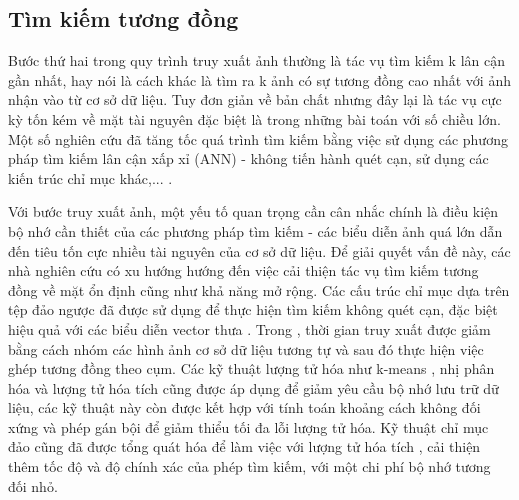 \subsection{Tìm kiếm tương đồng}
Bước thứ hai trong quy trình truy xuất ảnh thường là tác vụ tìm kiếm k lân cận gần nhất, hay nói là cách khác là tìm ra k ảnh có sự tương đồng cao nhất với ảnh nhận vào từ cơ sở dữ liệu. Tuy đơn giản về bản chất nhưng đây lại là tác vụ cực kỳ tốn kém về mặt tài nguyên đặc biệt là trong những bài toán với số chiều lớn. Một số nghiên cứu đã tăng tốc quá trình tìm kiếm bằng việc sử dụng các phương pháp tìm kiếm lân cận xấp xỉ (ANN) - không tiến hành quét cạn, sử dụng các kiến trúc chỉ mục khác,... \cite{4270175, Xie2015ImageCA, Mikolajczyk2007ImprovingDF, Muja2009FastAN, Muja2012FastMO, wang2017survey, magliani2019efficient, johnson2017billionscale}.

Với bước truy xuất ảnh, một yếu tố quan trọng cần cân nhắc chính là điều kiện bộ nhớ cần thiết của các phương pháp tìm kiếm - các biểu diễn ảnh quá lớn dẫn đến tiêu tốn cực nhiều tài nguyên của cơ sở dữ liệu. Để giải quyết vấn đề này, các nhà nghiên cứu có xu hướng hướng đến việc cải thiện tác vụ tìm kiếm tương đồng về mặt ổn định cũng như khả năng mở rộng. Các cấu trúc chỉ mục dựa trên tệp đảo ngược \cite{Salton1988TermWeightingAI} đã được sử dụng để thực hiện tìm kiếm không quét cạn, đặc biệt hiệu quả với các biểu diễn vector thưa \cite{Johns2011FromIT, Sivic2003VideoGA, imageSearchKernel, Mohedano2016sOL, noh2018largescale, Philbin2007ObjectRW}. Trong \cite{Johns2011FromIT}, thời gian truy xuất được giảm bằng cách nhóm các hình ảnh cơ sở dữ liệu tương tự và sau đó thực hiện việc ghép tương đồng theo cụm. Các kỹ thuật lượng tử hóa như k-means \cite{Philbin2007ObjectRW, Torii2013VisualPR}, nhị phân hóa \cite{Perronnin2010LargescaleIR} và lượng tử hóa tích \cite{imageSearchKernel} cũng được áp dụng để giảm yêu cầu bộ nhớ lưu trữ dữ liệu, các kỹ thuật này còn được kết hợp với tính toán khoảng cách không đối xứng \cite{5432202} và phép gán bội \cite{imageSearchKernel, Jgou2008HammingEA, 5432202, Philbin2007ObjectRW, Tolias2014VisualQE, Li2015PairwiseGM} để giảm thiểu tối đa lỗi lượng tử hóa. Kỹ thuật chỉ mục đảo cũng đã được tổng quát hóa để làm việc với lượng tử hóa tích \cite{Guo2016DeepLF, 5432202, Babenko2012TheIM}, cải thiện thêm tốc độ và độ chính xác của phép tìm kiếm, với một chi phí bộ nhớ tương đối nhỏ.